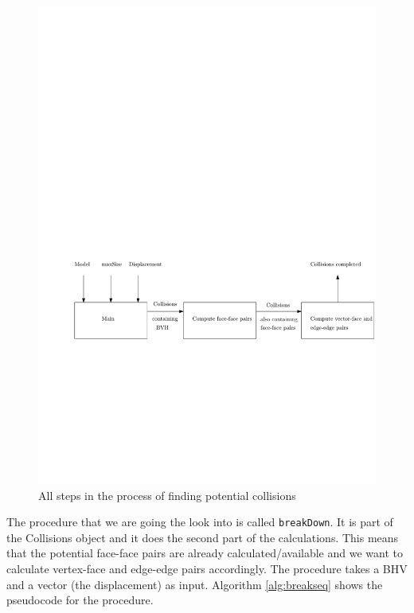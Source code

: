 \begin{figure}
	\includegraphics[width=\textwidth]{process.pdf}
	\caption{All steps in the process of finding potential collisions}
	\label{fig:process}
\end{figure}

The procedure that we are going the look into is called \texttt{breakDown}. It is part of the Collisions object and it does the second part of the calculations. This means that the potential face-face pairs are already calculated/available and we want to calculate vertex-face and edge-edge pairs accordingly. The procedure takes a BHV and a vector (the displacement) as input. Algorithm \ref{alg:breakseq} shows the pseudocode for the procedure.

